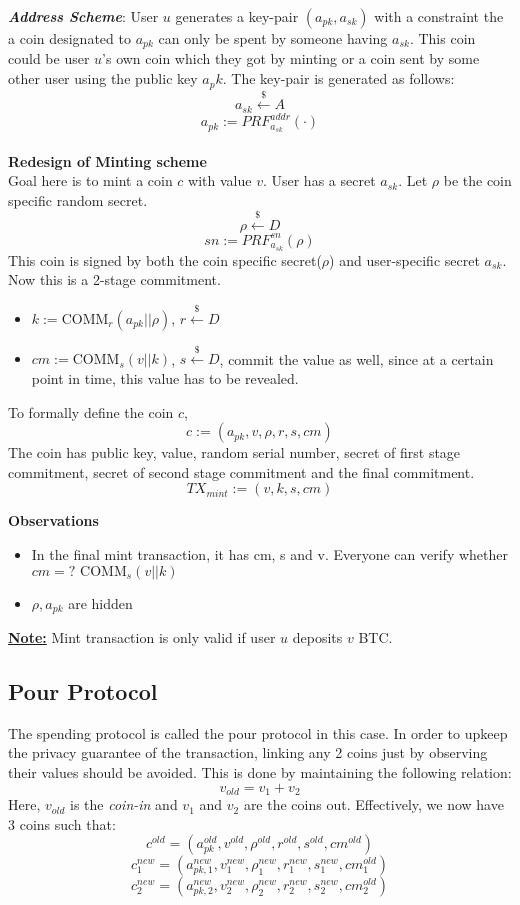 \documentclass[twoside]{article}
\begin{document}
\textbf{\textit{Address Scheme}}: User $u$ generates a key-pair $(a_{pk}, a_{sk})$ with a constraint the a coin designated to $a_{pk}$ can only be spent by someone having $a_{sk}$. This coin could be user $u$'s own coin which they got by minting or a coin sent by some other user using the public key $a_pk$. The key-pair is generated as follows: 
$$a_{sk} \xleftarrow{\$} A$$
$$a_{pk} := PRF_{a_{sk}}^{addr}(\cdot)$$ \\
\textbf{Redesign of Minting scheme} \\
Goal here is to mint a coin $c$ with value $v$. User has a secret $a_{sk}$. Let $\rho$ be the coin specific random secret.
$$\rho \xleftarrow{\$} D$$
$$sn := PRF_{a_{sk}}^{sn}(\rho)$$
This coin is signed by both the coin specific secret($\rho$) and user-specific secret $a_{sk}$. Now this is a 2-stage commitment. 
\begin{itemize}
    \item $k:=\text{COMM}_r(a_{pk} || \rho)$, $r \xleftarrow{\$}D$
    \item $cm:=\text{COMM}_s(v||k)$, $s \xleftarrow{\$}D$, commit the value as well, since at a certain point in time, this value has to be revealed. 
\end{itemize}
To formally define the coin $c$, \\
$$c:=(a_{pk}, v, \rho, r, s, cm)$$
The coin has public key, value, random serial number, secret of first stage commitment, secret of second stage commitment and the final commitment.  
$$TX_{mint} := (v, k, s, cm)$$

\textbf{Observations}
\begin{itemize}
    \item In the final mint transaction, it has cm, s and v. Everyone can verify whether $cm =? \text{ COMM}_s(v||k)$ 
    \item $\rho, a_{pk}$ are hidden 
\end{itemize}

\textbf{\underline{Note:}} Mint transaction is only valid if user $u$ deposits $v$ BTC.

\subsection{Pour Protocol}
The spending protocol is called the pour protocol in this case. In order to upkeep the privacy guarantee of the transaction, linking any 2 coins just by observing their values should be avoided. This is done by maintaining the following relation:
$$v_{old} = v_1 + v_2$$
Here, $v_{old}$ is the \textit{coin-in} and $v_1$ and $v_2$ are the coins out. Effectively, we now have 3 coins such that:
$$c^{old} = (a_{pk}^{old}, v^{old}, \rho^{old}, r^{old}, s^{old}, cm^{old}) $$
$$c_1^{new} = (a_{pk,1}^{new}, v_1^{new}, \rho_1^{new}, r_1^{new}, s_1^{new}, cm_1^{old})$$
$$c_2^{new} = (a_{pk,2}^{new}, v_2^{new}, \rho_2^{new}, r_2^{new}, s_2^{new}, cm_2^{old})$$
\end{document}

